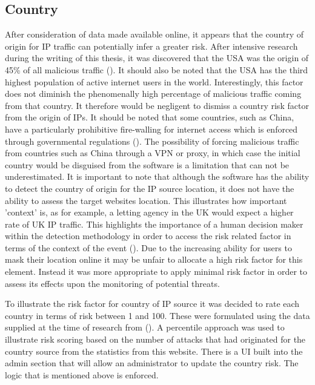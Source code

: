 \subsection{Country}

After consideration of data made available online, it appears that the country of origin for IP traffic can potentially infer a greater risk. After intensive research during the writing of this thesis, it was discovered that the USA was the origin of 45\% of all malicious traffic (\cite{Webattacks}). It should also be noted that the USA has the third highest population of active internet users in the world. Interestingly, this factor does not diminish the phenomenally high percentage of malicious traffic coming from that country. It therefore would be negligent to dismiss a country risk factor from the origin of IPs. It should be noted that some countries, such as China, have a particularly prohibitive fire-walling for internet access which is enforced through governmental regulations (\cite{China}). The possibility of forcing malicious traffic from countries such as China through a VPN or proxy, in which case the initial country would be disguised from the software is a limitation that can not be underestimated. It is important to note that although the software has the ability to detect the country of origin for the IP source location, it does not have the ability to assess the target websites location. This illustrates how important 'context' is, as for example, a letting agency in the UK would expect a higher rate of UK IP traffic. This highlights the importance of a human decision maker within the detection methodology in order to access the risk related factor in terms of the context of the event (\cite{cranor2008framework}). Due to the increasing ability for users to mask their location online it may be unfair to allocate a high risk factor for this element. Instead it was more appropriate to apply minimal risk factor in order to assess its effects upon the monitoring of potential threats.

To illustrate the risk factor for country of IP source it was decided to rate each country in terms of risk between 1 and 100. These were formulated using the data supplied at the time of research from (\cite{Webattacks}). A percentile approach was used to illustrate risk scoring based on the number of attacks that had originated for the country source from the statistics from this website. There is a UI built into the admin section that will allow an administrator to update the country risk. The logic that is mentioned above is enforced.

